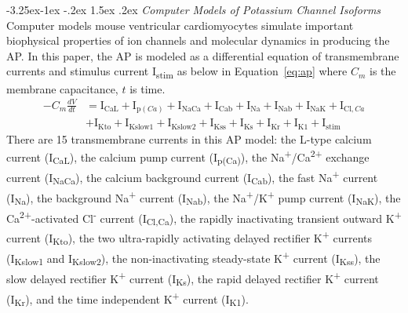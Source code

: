 \documentclass[11pt]{article}
\makeatletter
\renewcommand\subsection{\@startsection{subsection}{2}{\z@}%
                                     {-3.25ex\@plus -1ex \@minus -.2ex}%
                                     {1.5ex \@plus .2ex}%
                                     {\normalfont\fontfamily{phv}\fontsize{14}{17}\bfseries}}
\makeatother
\begin{document}
\subsection{\emph{Computer Models of Potassium Channel Isoforms}} \label{s:methods.1}
Computer models mouse ventricular cardiomyocytes simulate important biophysical properties of ion channels and molecular dynamics in producing the AP. In this paper, the AP is modeled as a differential equation of transmembrane currents and stimulus current I\textsubscript{stim} as below in Equation~\ref{eq:ap} where $C_{m}$ is the membrane capacitance, $t$ is time.
\begin{equation}
    \label{eq:ap}
    \begin{split}
    -C_{m}\frac{dV}{dt} &= \mathrm{I}_{\mathrm{CaL}}+\mathrm{I}_{\mathrm{p}(Ca)}+\mathrm{I}_{\mathrm{NaCa}}+\mathrm{I}_{\mathrm{Cab}}+\mathrm{I}_{\mathrm{Na}}+\mathrm{I}_{\mathrm{Nab}}+\mathrm{I}_{\mathrm{NaK}}+\mathrm{I}_{\mathrm{Cl},Ca} \\
    &+\mathrm{I}_{\mathrm{Kto}}+\mathrm{I}_{\mathrm{Kslow1}}+\mathrm{I}_{\mathrm{Kslow2}}+\mathrm{I}_{\mathrm{Kss}}+\mathrm{I}_{\mathrm{Ks}}+\mathrm{I}_{\mathrm{Kr}}+\mathrm{I}_{\mathrm{K1}}+\mathrm{I}_{\mathrm{stim}}
    \end{split}
\end{equation}
There are 15 transmembrane currents in this AP model: the L-type calcium current (I\textsubscript{CaL}), the calcium pump current (I\textsubscript{p(Ca)}), the Na\textsuperscript{+}/Ca\textsuperscript{2+} exchange current (I\textsubscript{NaCa}), the calcium background current (I\textsubscript{Cab}), the fast Na\textsuperscript{+} current (I\textsubscript{Na}), the background Na\textsuperscript{+} current (I\textsubscript{Nab}), the Na\textsuperscript{+}/K\textsuperscript{+} pump current (I\textsubscript{NaK}), the Ca\textsuperscript{2+}-activated Cl\textsuperscript{-} current (I\textsubscript{Cl,Ca}), the rapidly inactivating transient outward K\textsuperscript{+} current (I\textsubscript{Kto}), the two ultra-rapidly activating delayed rectifier K\textsuperscript{+} currents (I\textsubscript{Kslow1} and I\textsubscript{Kslow2}), the non-inactivating steady-state K\textsuperscript{+} current (I\textsubscript{Kss}), the slow delayed rectifier K\textsuperscript{+} current (I\textsubscript{Ks}), the rapid delayed rectifier K\textsuperscript{+} current (I\textsubscript{Kr}), and the time independent K\textsuperscript{+} current (I\textsubscript{K1}).
\end{document}
